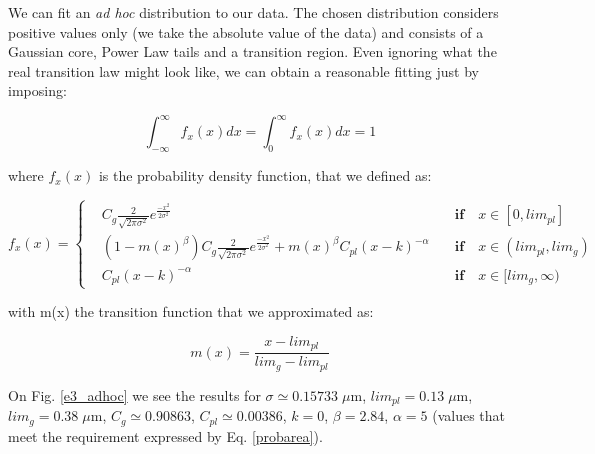 We can fit an \textit{ad hoc} distribution to our data. The chosen distribution considers positive values only (we take the absolute value of the data) and consists of a Gaussian core, Power Law tails and a transition region. Even ignoring what the real transition law might look like, we can obtain a reasonable fitting just by imposing:

\begin{equation}
\int_{-\infty}^{\infty} f_x(x) dx = \int_{0}^{\infty} f_x(x) dx = 1
\label{probarea}
\end{equation}

where $f_x(x)$ is the probability density function, that we defined as: 

\begin{equation}
f_x(x) = \left\{
\begin{aligned}
& C_g \frac{2}{\sqrt{2 \pi \sigma^2}} e^{\frac{-x^2}{2 \sigma^2}} & \quad \textbf{if} \quad x \in [0, lim_{pl}]\\ 
& (1-m(x)^\beta) C_g \frac{2}{\sqrt{2 \pi \sigma^2}} e^{\frac{-x^2}{2 \sigma^2}} + m(x)^\beta C_{pl} (x-k)^{-\alpha} & \quad \textbf{if} \quad x \in (lim_{pl}, lim_g)\\
& C_{pl} (x-k)^{-\alpha} & \quad \textbf{if} \quad x \in [lim_g,\infty)
\end{aligned}
\right.
\end{equation}

with m(x) the transition function that we approximated as:

\begin{equation}
m(x) = \frac{x-lim_{pl}}{lim_g-lim_{pl}}
\end{equation}

On Fig. \ref{e3_adhoc} we see the results for $\sigma \simeq 0.15733 \; \mu \textrm{m}$, $lim_{pl}=0.13 \; \mu \textrm{m}$, $lim_g=0.38 \; \mu \textrm{m}$, $C_g \simeq 0.90863$, $C_{pl} \simeq 0.00386$, $k = 0$, $\beta = 2.84$, $\alpha = 5$ (values that meet the requirement expressed by Eq. \ref{probarea}).

